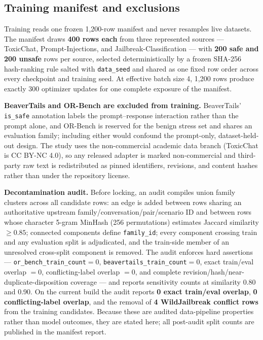 \documentclass[sigconf,nonacm]{acmart}
\begin{document}
\subsection{Training manifest and exclusions}
\label{subsec:manifest}

Training reads one frozen 1{,}200-row manifest and never resamples live datasets. The manifest draws \textbf{400 rows each} from three represented sources --- ToxicChat, Prompt-Injections, and Jailbreak-Classification --- with \textbf{200 safe and 200 unsafe} rows per source, selected deterministically by a frozen SHA-256 hash-ranking rule salted with \texttt{data\_seed} and shared as one fixed row order across every checkpoint and training seed. At effective batch size 4, 1{,}200 rows produce exactly 300 optimizer updates for one complete exposure of the manifest.

\textbf{BeaverTails and OR-Bench are excluded from training.} BeaverTails' \texttt{is\_safe} annotation labels the prompt--response interaction rather than the prompt alone, and OR-Bench is reserved for the benign stress set and shares an evaluation family; including either would confound the prompt-only, dataset-held-out design. The study uses the non-commercial academic data branch (ToxicChat is CC BY-NC 4.0), so any released adapter is marked non-commercial and third-party raw text is redistributed as pinned identifiers, revisions, and content hashes rather than under the repository license.

\textbf{Decontamination audit.} Before locking, an audit compiles union family clusters across all candidate rows: an edge is added between rows sharing an authoritative upstream family/conversation/pair/scenario ID and between rows whose character 5-gram MinHash (256 permutations) estimates Jaccard similarity $\ge 0.85$; connected components define \texttt{family\_id}; every component crossing train and any evaluation split is adjudicated, and the train-side member of an unresolved cross-split component is removed. The audit enforces hard assertions --- \texttt{or\_bench\_train\_count}$=0$, \texttt{beavertails\_train\_count}$=0$, exact train/eval overlap $=0$, conflicting-label overlap $=0$, and complete revision/hash/near-duplicate-disposition coverage --- and reports sensitivity counts at similarity 0.80 and 0.90. On the current build the audit reports \textbf{0 exact train/eval overlap}, \textbf{0 conflicting-label overlap}, and the removal of \textbf{4 WildJailbreak conflict rows} from the training candidates. Because these are audited data-pipeline properties rather than model outcomes, they are stated here; all post-audit split counts are published in the manifest report.
\end{document}
